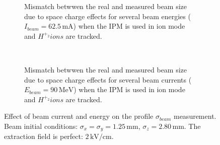 \begin{figure}[!ht]
	\begin{subfigure}[t]{0.5\textwidth}
		
		\caption{
		Mismatch betwwen the real and measured beam size due to space charge effects for several beam energies ($I_{beam}=62.5\,\mathrm{mA}$) when the IPM is used in ion mode and $H^{+_2} ions$ are tracked.
		}
		\label{chap3:fig:SC_a}
	\end{subfigure}
	~
	\begin{subfigure}[t]{0.5\textwidth}
		
		\caption{
		Mismatch betwwen the real and measured beam size due to space charge effects for several beam currents ($E_{beam}=90\,\mathrm{MeV}$) when the IPM is used in ion mode and $H^{+_2} ions$ are tracked.
		}
		\label{chap3:fig:SC_b}
	\end{subfigure}
	\caption[Effect of beam current and energy on the profile $\sigma_{beam}$ measurement]{Effect of beam current and energy on the profile $\sigma_{beam}$ measurement. Beam initial conditions: $\sigma_{x}=\sigma_{y}=1.25\,\mathrm{mm}$, $\sigma_{z} = 2.80\,\mathrm{mm}$. The extraction field is perfect: $2\,\mathrm{kV/cm}$.}
	\label{chap3:fig:SC}
\end{figure}

